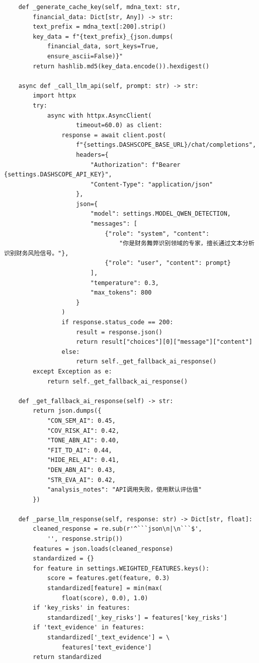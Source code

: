 \documentclass[a4paper,10pt]{article}
\begin{document}
\begin{lstlisting}
    def _generate_cache_key(self, mdna_text: str,
        financial_data: Dict[str, Any]) -> str:
        text_prefix = mdna_text[:200].strip()
        key_data = f"{text_prefix}_{json.dumps(
            financial_data, sort_keys=True,
            ensure_ascii=False)}"
        return hashlib.md5(key_data.encode()).hexdigest()

    async def _call_llm_api(self, prompt: str) -> str:
        import httpx
        try:
            async with httpx.AsyncClient(
                    timeout=60.0) as client:
                response = await client.post(
                    f"{settings.DASHSCOPE_BASE_URL}/chat/completions",
                    headers={
                        "Authorization": f"Bearer {settings.DASHSCOPE_API_KEY}",
                        "Content-Type": "application/json"
                    },
                    json={
                        "model": settings.MODEL_QWEN_DETECTION,
                        "messages": [
                            {"role": "system", "content":
                                "你是财务舞弊识别领域的专家，擅长通过文本分析识别财务风险信号。"},
                            {"role": "user", "content": prompt}
                        ],
                        "temperature": 0.3,
                        "max_tokens": 800
                    }
                )
                if response.status_code == 200:
                    result = response.json()
                    return result["choices"][0]["message"]["content"]
                else:
                    return self._get_fallback_ai_response()
        except Exception as e:
            return self._get_fallback_ai_response()

    def _get_fallback_ai_response(self) -> str:
        return json.dumps({
            "CON_SEM_AI": 0.45,
            "COV_RISK_AI": 0.42,
            "TONE_ABN_AI": 0.40,
            "FIT_TD_AI": 0.44,
            "HIDE_REL_AI": 0.41,
            "DEN_ABN_AI": 0.43,
            "STR_EVA_AI": 0.42,
            "analysis_notes": "API调用失败，使用默认评估值"
        })

    def _parse_llm_response(self, response: str) -> Dict[str, float]:
        cleaned_response = re.sub(r'^```json\n|\n```$',
            '', response.strip())
        features = json.loads(cleaned_response)
        standardized = {}
        for feature in settings.WEIGHTED_FEATURES.keys():
            score = features.get(feature, 0.3)
            standardized[feature] = min(max(
                float(score), 0.0), 1.0)
        if 'key_risks' in features:
            standardized['_key_risks'] = features['key_risks']
        if 'text_evidence' in features:
            standardized['_text_evidence'] = \
                features['text_evidence']
        return standardized


\end{lstlisting}
\end{document}
